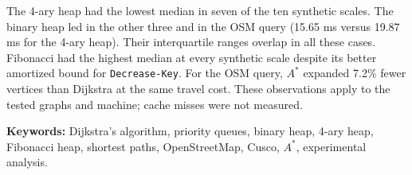 The 4-ary heap had the lowest median in seven of the ten synthetic scales. The binary heap led in the other three and in the OSM query (15.65 ms versus 19.87 ms for the 4-ary heap). Their interquartile ranges overlap in all these cases. Fibonacci had the highest median at every synthetic scale despite its better amortized bound for \texttt{Decrease-Key}. For the OSM query, $A^*$ expanded 7.2\% fewer vertices than Dijkstra at the same travel cost. These observations apply to the tested graphs and machine; cache misses were not measured.

\vspace{0.4cm}
\noindent\textbf{Keywords:} Dijkstra's algorithm, priority queues, binary heap, 4-ary heap, Fibonacci heap, shortest paths, OpenStreetMap, Cusco, $A^*$, experimental analysis.

